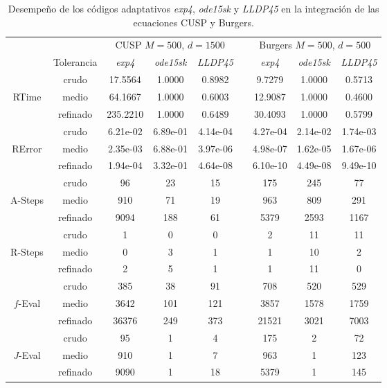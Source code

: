 \begin{table}[htb]
	\caption{Desempeño de los códigos adaptativos \emph{exp4}, \emph{ode15sk} y \emph{LLDP45} en la integración de las ecuaciones  CUSP y Burgers.}
	\label{tab:num-exp-lldp-var-step:cuspburg}
	\begin{adjustbox}{width=0.8\columnwidth,center}
	\begin{tabular}{ ccccccccc }
		\hline
		& & \multicolumn{3}{c}{CUSP $M=500$, $d=1500$ } & & \multicolumn{3}{c}{Burgers $M=500$, $d=500$ }\\
		\cline{3-5} \cline{7-9}
		& Tolerancia & \emph{exp4} & \emph{ode15sk} & \emph{LLDP45} & & \emph{exp4} & \emph{ode15sk} & \emph{LLDP45} \\
		\hline
		& crudo & 17.5564 & 1.0000 & 0.8982 & & 9.7279 & 1.0000 & 0.5713 \\
		RTime  & medio & 64.1667 & 1.0000 & 0.6003 & & 12.9087 & 1.0000 & 0.4600 \\
		& refinado & 235.2210 & 1.0000 & 0.6489 & & 30.4093 & 1.0000 & 0.5799 \\
		\hline
		& crudo & 6.21e-02 & 6.89e-01 & 4.14e-04 & & 4.27e-04 & 2.14e-02 & 1.74e-03 \\
		RError  & medio & 2.35e-03 & 6.88e-01 & 3.97e-06 & & 4.98e-07 & 1.62e-05 & 1.67e-06 \\
		& refinado & 1.94e-04 & 3.32e-01 & 4.64e-08 & & 6.10e-10 & 4.49e-08 & 9.49e-10  \\
		\hline
		& crudo & 96 & 23 & 15 & & 175 & 245 & 77 \\
		A-Steps  & medio & 910 & 71 & 19 & &  963 & 809 & 291 \\
		& refinado & 9094 & 188 & 61  & & 5379 & 2593 & 1167 \\
		\hline
		& crudo & 1 & 0 & 0  & & 2 & 11 & 11 \\
		R-Steps  & medio & 0 & 3 & 1  & & 1 & 10 & 2 \\
		& refinado & 2 & 5 & 1  & & 1 & 11 & 0 \\
		\hline
		& crudo & 385 & 38 & 91  & & 708 & 520 & 529 \\
		$f$-Eval  & medio & 3642 & 101 & 121  & & 3857 & 1578 & 1759 \\
		& refinado & 36376 & 249 & 373  & & 21521 & 3021 & 7003 \\
		\hline
		& crudo & 95 & 1 & 4 &  & 175 & 2 & 72 \\
		$J$-Eval  & medio & 910 & 1 & 7 & &  963 & 1 & 123 \\
		& refinado & 9090 & 1 & 18 & &  5379 & 1 & 145 \\

\end{tabular}
\end{adjustbox}
\end{table}
